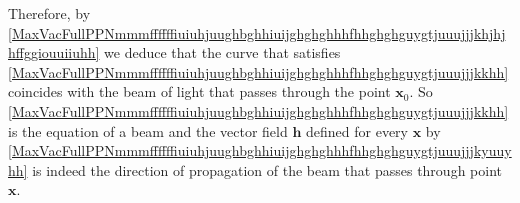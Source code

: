 \documentclass{article}
\theoremstyle{definition}
\theoremstyle{remark}
\renewcommand{\vec}[1]{\mathbf{#1}}
\newcommand{\er}{\eqref}
\newcommand{\er}{\eqref}
\begin{document}
Therefore, by
\er{MaxVacFullPPNmmmffffffiuiuhjuughbghhiuijghghghhhfhhghghguygtjuuujjjkhjhjhffggiouuiiuhh}
we deduce that the curve that satisfies
\er{MaxVacFullPPNmmmffffffiuiuhjuughbghhiuijghghghhhfhhghghguygtjuuujjjkkhh}
coincides with the beam of light that passes through the point $\vec
x_0$. So
\er{MaxVacFullPPNmmmffffffiuiuhjuughbghhiuijghghghhhfhhghghguygtjuuujjjkkhh}
is the equation of a beam and the vector field $\vec h$ defined for
every $\vec x$ by
\er{MaxVacFullPPNmmmffffffiuiuhjuughbghhiuijghghghhhfhhghghguygtjuuujjjkyuuyhh}
is indeed the direction of propagation of the beam that passes
through point $\vec x$.
%
%
%
\end{document}
